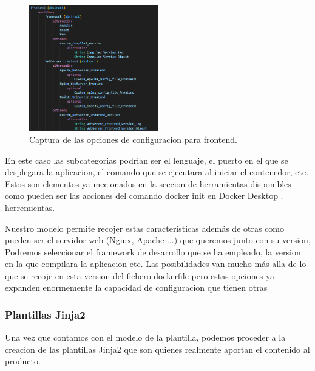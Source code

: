 \documentclass[12pt, a4paper, twoside]{article}
\begin{document}
\begin{figure}[h]
	\centering
	  \includegraphics[width=0.5\textwidth]{dockerfile.frontend.png}
	\caption{Captura de las opciones de configuracion para frontend.}
\end{figure}

En este caso las subcategorias podrian ser el lenguaje, el puerto en el que se desplegara la aplicacion, el comando que se ejecutara al iniciar el contenedor, etc.
Estos son elementos ya mecionados en la seccion de herramientas disponibles como pueden ser las acciones del comando docker init en Docker Desktop \cite{docker_desktop}. 
herremientas. 
  

Nuestro modelo permite recojer estas caracteristicas además de otras 
como pueden ser el servidor web (Nginx, Apache ...) que queremos junto con su version, Podremos seleccionar el framework de desarrollo que se ha empleado, la version en la que compilara la aplicacion etc.
Las posibilidades van mucho más alla de lo que se recoje en esta version del fichero dockerfile pero estas opciones ya expanden enormemente la capacidad de configuracion que tienen otras 



\subsubsection{Plantillas Jinja2}
Una vez que contamos con el modelo de la plantilla, podemos proceder a la creacion de las plantillas Jinja2 que son quienes realmente aportan el contenido al producto.
\end{document}
